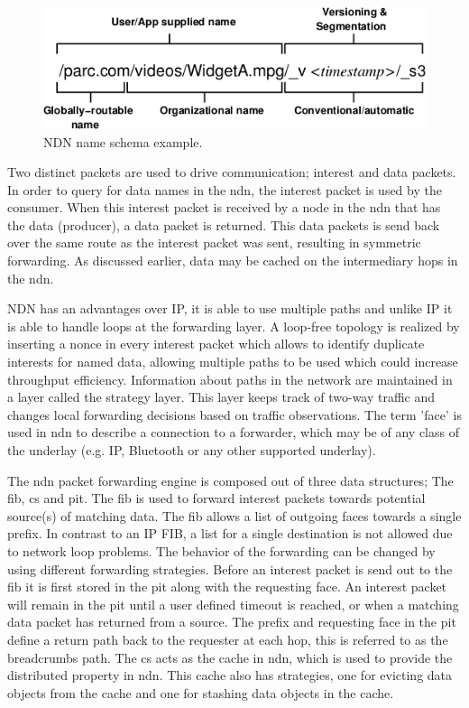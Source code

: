 \begin{figure}[H]
\centering
\includegraphics[width=\columnwidth/2]{Images/ndn_name.png}
\caption{NDN name schema example.}
\label{fig:ndn_name}
\end{figure}

Two distinct packets are used to drive communication; interest and data packets. In order to query for data names in the \gls{ndn}, the interest packet is used by the consumer. When this interest packet is received by a node in the \gls{ndn} that has the data (producer), a data packet is returned. This data packets is send back over the same route as the interest packet was sent, resulting in symmetric forwarding. As discussed earlier, data may be cached on the intermediary hops in the \gls{ndn}.

NDN has an advantages over IP, it is able to use multiple paths and unlike IP it is able to handle loops at the forwarding layer. A loop-free topology is realized by inserting a nonce in every interest packet which allows to identify duplicate interests for named data, allowing multiple paths to be used which could increase throughput efficiency. Information about paths in the network are maintained in a layer called the strategy layer. This layer keeps track of two-way traffic and changes local forwarding decisions based on traffic observations. The term 'face' is used in \gls{ndn} to describe a connection to a forwarder, which may be of any class of the underlay (e.g. IP, Bluetooth or any other supported underlay).

The \gls{ndn} packet forwarding engine is composed out of three data structures; The \gls{fib}, \gls{cs} and \gls{pit}. The \gls{fib} is used to forward interest packets towards potential source(s) of matching data. The \gls{fib} allows a list of outgoing faces towards a single prefix. In contrast to an IP FIB, a list for a single destination is not allowed due to network loop problems. The behavior of the forwarding can be changed by using different forwarding strategies. Before an interest packet is send out to the \gls{fib} it is first stored in the \gls{pit} along with the requesting face. An interest packet will remain in the \gls{pit} until a user defined timeout is reached, or when a matching data packet has returned from a source. The prefix and requesting face in the \gls{pit} define a return path back to the requester at each hop, this is referred to as the breadcrumbs path. The \gls{cs} acts as the cache in \gls{ndn}, which is used to provide the distributed property in \gls{ndn}. This cache also has strategies, one for evicting data objects from the cache and one for stashing data objects in the cache.

